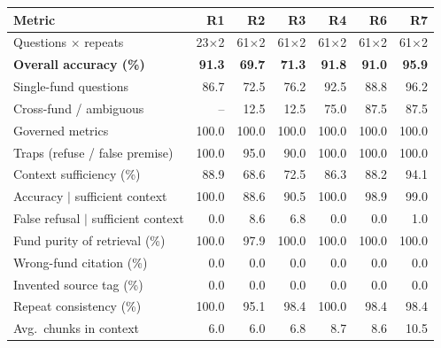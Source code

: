 \begin{tabular}{lrrrrrr}
\toprule
Metric & R1 & R2 & R3 & R4 & R6 & R7 \\
\midrule
Questions $\times$ repeats & 23$\times$2 & 61$\times$2 & 61$\times$2 & 61$\times$2 & 61$\times$2 & 61$\times$2 \\
\textbf{Overall accuracy (\%)} & \textbf{91.3} & \textbf{69.7} & \textbf{71.3} & \textbf{91.8} & \textbf{91.0} & \textbf{95.9} \\
\quad Single-fund questions & 86.7 & 72.5 & 76.2 & 92.5 & 88.8 & 96.2 \\
\quad Cross-fund / ambiguous & -- & 12.5 & 12.5 & 75.0 & 87.5 & 87.5 \\
\quad Governed metrics & 100.0 & 100.0 & 100.0 & 100.0 & 100.0 & 100.0 \\
\quad Traps (refuse / false premise) & 100.0 & 95.0 & 90.0 & 100.0 & 100.0 & 100.0 \\
Context sufficiency (\%) & 88.9 & 68.6 & 72.5 & 86.3 & 88.2 & 94.1 \\
Accuracy $\mid$ sufficient context & 100.0 & 88.6 & 90.5 & 100.0 & 98.9 & 99.0 \\
False refusal $\mid$ sufficient context & 0.0 & 8.6 & 6.8 & 0.0 & 0.0 & 1.0 \\
Fund purity of retrieval (\%) & 100.0 & 97.9 & 100.0 & 100.0 & 100.0 & 100.0 \\
Wrong-fund citation (\%) & 0.0 & 0.0 & 0.0 & 0.0 & 0.0 & 0.0 \\
Invented source tag (\%) & 0.0 & 0.0 & 0.0 & 0.0 & 0.0 & 0.0 \\
Repeat consistency (\%) & 100.0 & 95.1 & 98.4 & 100.0 & 98.4 & 98.4 \\
Avg.\ chunks in context & 6.0 & 6.0 & 6.8 & 8.7 & 8.6 & 10.5 \\
\bottomrule
\end{tabular}
